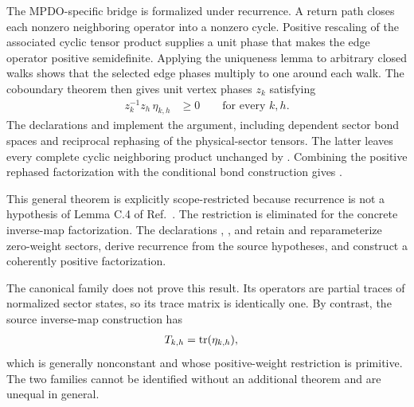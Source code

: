 \documentclass{article}
\begin{document}
The MPDO-specific bridge is formalized under recurrence. A return path closes
each nonzero neighboring operator into a nonzero cycle. Positive rescaling of
the associated cyclic tensor product supplies a unit phase that makes the edge
operator positive semidefinite. Applying the uniqueness lemma to arbitrary
closed walks shows that the selected edge phases multiply to one around each
walk. The coboundary theorem then gives unit vertex phases $z_k$ satisfying
\begin{align}
    z_k^{-1}z_h\,\eta_{k,h}
        &\geq 0
        \qquad\text{for every }k,h.
    \label{eq:cpgsv17_mpdo_sal_zcl_eta_local_structure_vertex_rephased_eta_positive}
\end{align}
The declarations
 and
implement the argument, including dependent sector bond spaces and reciprocal
rephasing of the physical-sector tensors. The latter leaves every complete
cyclic neighboring product unchanged by
.
Combining the positive rephased factorization with the conditional bond
construction gives
.

This general theorem is explicitly scope-restricted because recurrence is not
a hypothesis of Lemma C.4 of Ref.~\cite{Cirac2016MPDO_arXiv}. The restriction
is eliminated for the concrete inverse-map factorization. The declarations
,
, and
retain and reparameterize zero-weight sectors, derive recurrence from the
source hypotheses, and construct a coherently positive factorization.

The canonical family
 does not prove this
result. Its operators are partial traces of normalized sector states, so its
trace matrix is identically one. By contrast, the source inverse-map
construction has
\begin{align}
    T_{k,h}
        &=
        \operatorname{tr}(\eta_{k,h}),
    \label{eq:cpgsv17_mpdo_sal_zcl_eta_local_structure_inverse_map_trace_matrix}
\end{align}
which is generally nonconstant and whose positive-weight restriction is
primitive. The two families cannot be identified without an additional
theorem and are unequal in general.
\end{document}
